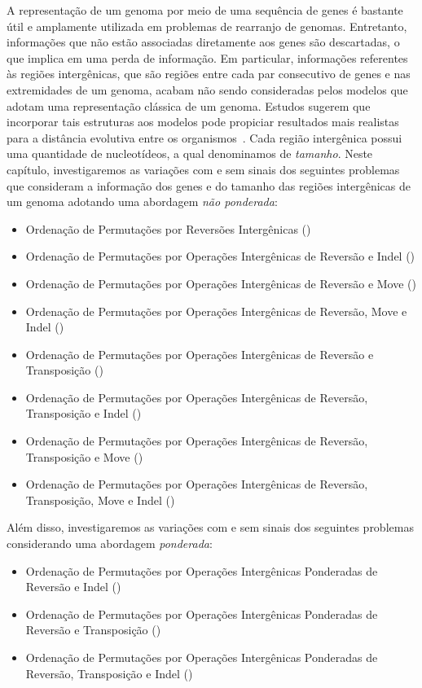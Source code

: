 
A representação de um genoma por meio de uma sequência de genes é bastante útil e amplamente utilizada em problemas de rearranjo de genomas. Entretanto, informações que não estão associadas diretamente aos genes são descartadas, o que implica em uma perda de informação. Em particular, informações referentes às regiões intergênicas, que são regiões entre cada par consecutivo de genes e nas extremidades de um genoma, acabam não sendo consideradas pelos modelos que adotam uma representação clássica de um genoma. Estudos sugerem que incorporar tais estruturas aos modelos pode propiciar resultados mais realistas para a distância evolutiva entre os organismos~\cite{2016a-biller-etal, 2016b-biller-etal}. Cada região intergênica possui uma quantidade de nucleotídeos, a qual denominamos de \emph{tamanho}. Neste capítulo, investigaremos as variações com e sem sinais dos seguintes problemas que consideram a informação dos genes e do tamanho das regiões intergênicas de um genoma adotando uma abordagem \emph{não ponderada}:

\begin{itemize}
  \item Ordenação de Permutações por Reversões Intergênicas (\SbIR)
  \item Ordenação de Permutações por Operações Intergênicas de Reversão e Indel (\SbIRI)
  \item Ordenação de Permutações por Operações Intergênicas de Reversão e Move \break (\SbIRM)
  \item Ordenação de Permutações por Operações Intergênicas de Reversão, Move e Indel (\SbIRMI)
  \item Ordenação de Permutações por Operações Intergênicas de Reversão e Transposição (\SbIRT)
  \item Ordenação de Permutações por Operações Intergênicas de Reversão, Transposição e Indel (\SbIRTI)
  \item Ordenação de Permutações por Operações Intergênicas de Reversão, Transposição e Move (\SbIRTM)
  \item Ordenação de Permutações por Operações Intergênicas de Reversão, Transposição, Move e Indel (\SbIRTMI)
\end{itemize}

Além disso, investigaremos as variações com e sem sinais dos seguintes problemas considerando uma abordagem \emph{ponderada}:

\begin{itemize}
  \item Ordenação de Permutações por Operações Intergênicas Ponderadas de Reversão e Indel (\SbWIRI)
  \item Ordenação de Permutações por Operações Intergênicas Ponderadas de Reversão e Transposição (\SbWIRT)
  \item Ordenação de Permutações por Operações Intergênicas Ponderadas de Reversão, Transposição e Indel (\SbWIRTI)
\end{itemize}

